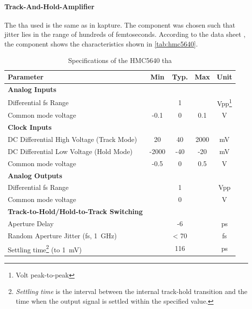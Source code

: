 \paragraph{Track-And-Hold-Amplifier}
The \gls{tha} used is the same as in \gls{kapture}. The component was chosen such that jitter lies in the range of hundreds of femtoseconds. \cite{caselle2013}
According to the data sheet \cite{hmc5640}, the component shows the characteristics shown in \autoref{tab:hmc5640}.
\begin{table}[tbh]
	\caption[HMC5640 Characteristics]{Specifications of the HMC5640 \gls{tha}}
	\label{tab:hmc5640}
	\begin{minipage}{\textwidth}
		\centering
		\begin{tabularx}{\textwidth}{Xcccc}
			\toprule
			\textbf{Parameter} & \textbf{Min} & \textbf{Typ.} & \textbf{Max} & \textbf{Unit}\\
			\midrule
			\textbf{Analog Inputs} &&&& \\
			Differential \gls{fs} Range & & 1 & & Vpp\footnote{Volt peak-to-peak}\\
			Common mode voltage & -0.1 & 0 & 0.1 & V\\[0.3cm]
			\textbf{Clock Inputs} &&&&\\
			DC Differential High Voltage (Track Mode) & 20 & 40 & 2000 & mV\\
			DC Differential Low Voltage (Hold Mode) & -2000 & -40 & -20 & mV\\
			Common mode voltage & -0.5 & 0 & 0.5 & V\\[0.3cm]
			\textbf{Analog Outputs} &&&&\\
			Differential \gls{fs} Range &  & 1 && Vpp\\
			Common mode voltage & & 0 & & V\\[0.3cm]
			\textbf{Track-to-Hold/Hold-to-Track Switching} &&&&\\
			Aperture Delay & & -6 &  & ps\\
			Random Aperture Jitter (\gls{fs}, \SI{1}{\giga \hertz}) & & < 70 & & fs\\
			Settling time\footnote{\textit{Settling time} is the interval between the internal track-hold transition and the time when the output signal is settled within the specified value.} (to \SI{1}{\milli \volt}) &	&  116 & & ps \\
			\bottomrule
		\end{tabularx}
	\end{minipage}
\end{table}

